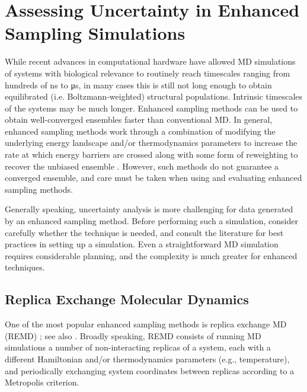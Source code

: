 \section{Assessing Uncertainty in Enhanced Sampling Simulations}
\label{sec:enhanced}

While recent advances in computational hardware have allowed MD simulations of systems with biological relevance to routinely reach timescales ranging from hundreds of \si{\nano\second} to \si{\micro\second}, in many cases this is still not long enough to obtain equilibrated (i.e. Boltzmann-weighted) structural populations.  Intrinsic timescales of the systems may be much longer.
Enhanced sampling methods can be used to obtain well-converged ensembles faster than conventional MD. In general, enhanced sampling methods work through a combination of modifying the underlying energy landscape and/or thermodynamics parameters to increase the rate at which energy barriers are crossed along with some form of reweighting to recover the unbiased ensemble \cite{Zuckerman2011}. However, such methods do not guarantee a converged ensemble, and care must be taken when using and evaluating enhanced sampling methods.

Generally speaking, uncertainty analysis is more challenging for data generated by an enhanced sampling method.
Before performing such a simulation, consider carefully whether the technique is needed, and consult the literature for best practices in setting up a simulation.
Even a straightforward MD simulation requires considerable planning, and the complexity is much greater for enhanced techniques.

\subsection{Replica Exchange Molecular Dynamics}
One of the most popular enhanced sampling methods is replica exchange MD (REMD) \citep{Sugita1999}; see also \cite{Swendsen-1986}. Broadly speaking, REMD consists of running MD simulations a number of non-interacting replicas of a system, each with a different Hamiltonian and/or thermodynamics parameters (e.g., temperature), and periodically exchanging system coordinates between replicas according to a Metropolis criterion.

